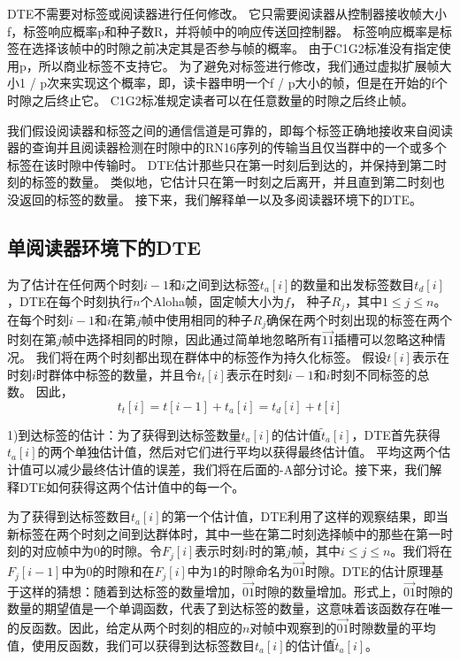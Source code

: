 \documentclass[UTF8]{ctexart}
\newcommand{\RNum}[1]{\uppercase\expandafter{\romannumeral #1\relax}}
\begin{document}
DTE不需要对标签或阅读器进行任何修改。 它只需要阅读器从控制器接收帧大小f，标签响应概率p和种子数R，并将帧中的响应传送回控制器。 标签响应概率是标签在选择该帧中的时隙之前决定其是否参与帧的概率。 由于C1G2标准没有指定使用p，所以商业标签不支持它。 为了避免对标签进行修改，我们通过虚拟扩展帧大小1 / p次来实现这个概率，即，读卡器申明一个f / p大小的帧，但是在开始的f个时隙之后终止它。 C1G2标准规定读者可以在任意数量的时隙之后终止帧。

我们假设阅读器和标签之间的通信信道是可靠的，即每个标签正确地接收来自阅读器的查询并且阅读器检测在时隙中的RN16序列的传输当且仅当群中的一个或多个标签在该时隙中传输时。 DTE估计那些只在第一时刻后到达的，并保持到第二时刻的标签的数量。 类似地，它估计只在第一时刻之后离开，并且直到第二时刻也没返回的标签的数量。 接下来，我们解释单一以及多阅读器环境下的DTE。

\subsection{单阅读器环境下的DTE}
为了估计在任何两个时刻$i-1$和$i$之间到达标签$t_a[i]$的数量和出发标签数目$t_d[i]$，DTE在每个时刻执行$n$个Aloha帧，固定帧大小为$f$， 种子$R_j$，其中$1\leq j\leq n$。 在每个时刻$i-1$和$i$在第$j$帧中使用相同的种子$R_j$确保在两个时刻出现的标签在两个时刻在第$j$帧中选择相同的时隙，因此通过简单地忽略所有$\overrightarrow{11}$插槽可以忽略这种情况。 我们将在两个时刻都出现在群体中的标签作为持久化标签。 假设$t[i]$表示在时刻$i$时群体中标签的数量，并且令$t_t[i]$表示在时刻$i-1$和$i$时刻不同标签的总数。 因此，
\begin{equation}
	t_t[i]=t[i-1]+t_a[i]=t_d[i]+t[i]
\end{equation}

1)到达标签的估计：为了获得到达标签数量$t_a[i]$的估计值$\widetilde{t}_a[i]$，DTE首先获得$t_a[i]$的两个单独估计值，然后对它们进行平均以获得最终估计值。 平均这两个估计值可以减少最终估计值的误差，我们将在后面的\RNum{4}-A部分讨论。接下来，我们解释DTE如何获得这两个估计值中的每一个。

为了获得到达标签数目$t_a[i]$的第一个估计值，DTE利用了这样的观察结果，即当新标签在两个时刻之间到达群体时，其中一些在第二时刻选择帧中的那些在第一时刻的对应帧中为0的时隙。令$F_j[i]$表示时刻$i$时的第$j$帧，其中$i\leq j\leq n$。我们将在$F_j[i-1]$中为$0$的时隙和在$F_j[i]$中为1的时隙命名为$\overrightarrow{01}$时隙。DTE的估计原理基于这样的猜想：随着到达标签的数量增加，$\overrightarrow{01}$时隙的数量增加。形式上，$\overrightarrow{01}$时隙的数量的期望值是一个单调函数，代表了到达标签的数量，这意味着该函数存在唯一的反函数。因此，给定从两个时刻的相应的$n$对帧中观察到的$\overrightarrow{01}$时隙数量的平均值，使用反函数，我们可以获得到达标签数目$t_a[i]$的估计值$\widetilde{t}_a[i]$。
\end{document}
